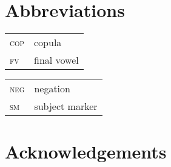 \documentclass[output=paper]{langsci/langscibook}
\begin{document}
\section*{Abbreviations}
\begin{tabularx}{.45\textwidth}{lX}
\textsc{cop} & copula\\ 
\textsc{fv} & final vowel\\
\end{tabularx}
\begin{tabularx}{.45\textwidth}{lX}
\textsc{neg} & negation\\ 
\textsc{sm} & subject marker\\
\end{tabularx}


\section*{Acknowledgements}

{\sloppy
\printbibliography[heading=subbibliography,notkeyword=this]
}
\end{document}
